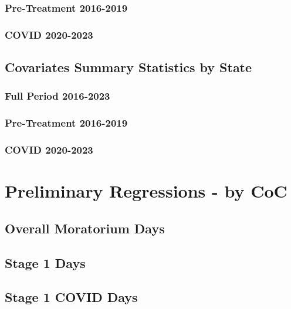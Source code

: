 \documentclass{article}
\begin{document}
\subsubsection*{Pre-Treatment 2016-2019}

\subsubsection*{COVID 2020-2023}



\newpage
\subsection*{Covariates Summary Statistics by State}
\subsubsection*{Full Period 2016-2023}

\subsubsection*{Pre-Treatment 2016-2019}

\subsubsection*{COVID 2020-2023}



\newpage
\section*{Preliminary Regressions - by CoC}

\subsection*{Overall Moratorium Days}


\subsection*{Stage 1 Days}


\subsection*{Stage 1 COVID Days}

\end{document}
